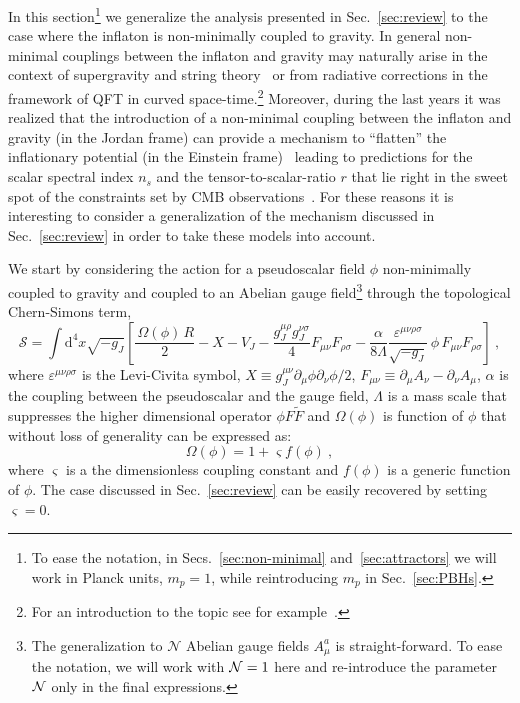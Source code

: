 In this section\footnote{To ease the notation, in Secs.~\ref{sec:non-minimal} and~\ref{sec:attractors} we will work in Planck units, $m_p = 1$, while reintroducing $m_p$ in Sec.~\ref{sec:PBHs}.} we generalize the analysis presented in Sec.~\ref{sec:review} to the case where the inflaton is non-minimally coupled to gravity. In general non-minimal couplings between the inflaton and gravity may naturally arise in the context of supergravity and string theory~\cite{Kallosh:2000ve} or from radiative corrections in the framework of QFT in curved space-time.\footnote{For an introduction to the topic see for example~\cite{Birrel:1984}.} Moreover, during the last years it was realized that the introduction of a non-minimal coupling between the inflaton and gravity (in the Jordan frame) can provide a mechanism to ``flatten'' the inflationary potential (in the Einstein frame)~\cite{Bezrukov:2007ep,Bezrukov:2009db,Kallosh:2013tua,Einhorn:2009bh,Ferrara:2010yw,Buchmuller:2013zfa,Giudice:2014toa,Pallis:2013yda,Pallis:2014dma,Pallis:2014boa,Ellis:2013xoa,Kallosh:2013xya,
Nakayama:2010ga} leading to predictions for the scalar spectral index $n_s$ and the  tensor-to-scalar-ratio $r$  that lie right in the sweet spot of the constraints set by CMB observations~\cite{Ade:2015lrj}. For these reasons it is interesting to consider a generalization of the mechanism discussed in Sec.~\ref{sec:review} in order to take these models into account.

 
We start by considering the action for a pseudoscalar field $\phi$ non-minimally coupled to gravity and coupled to an Abelian gauge field\footnote{The generalization to $\mathcal{N}$ Abelian gauge fields $A^a_{\mu}$ is straight-forward. To ease the notation, we will work with ${\cal N} = 1$ here and re-introduce the parameter ${\cal N}$ only in the final expressions.} through the topological Chern-Simons term,
\begin{equation}
	\label{non_minimal:jordan_frame}
	\mathcal{S} = \int \textrm{d}^4 x \sqrt{-g_J} \left[ \frac{\, \Omega(\phi ) \, R}{2} -X -V_J -\frac{g_J^{\mu\rho}g_J^{\nu\sigma}}{4} F_{\mu\nu}F_{\rho\sigma} -\frac{\alpha}{8 \Lambda} \frac{\varepsilon^{\mu\nu\rho\sigma}}{ \sqrt{-g_J}} \, \phi \, F_{\mu\nu}F_{\rho\sigma} \right] \ ,
\end{equation}
where $\varepsilon^{\mu\nu\rho\sigma}$ is the Levi-Civita symbol, $X \equiv g_J^{\mu \nu} \partial_{\mu} \phi \partial_{\nu} \phi /2$, $F_{\mu\nu} \equiv \partial_{\mu} A_{\nu} - \partial_{\nu} A_{\mu}$, $\alpha$ is the coupling between the pseudoscalar and the gauge field, $\Lambda $ is a mass scale that suppresses the higher dimensional operator $\phi F \tilde{F}$ and $\Omega(\phi)$ is function of $\phi$ that without loss of generality can be expressed as:
\begin{equation}
	\Omega(\phi) = 1 + \varsigma f(\phi) \ , 
\end{equation}
where $\varsigma$ is a the dimensionless coupling constant and $f(\phi)$ is a generic function of $\phi$. The case discussed in Sec.~\ref{sec:review} can be easily recovered by setting $\varsigma = 0$.

